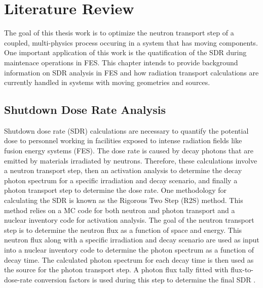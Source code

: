 \chapter{Literature Review} \label{ch:litrev}
The goal of this thesis work is to optimize the neutron transport step of a
coupled, multi-physics process occuring in a system that has moving components.  One
important application of this work is the quatification of the SDR during
maintenace operations in FES.
This chapter intends to provide background information on SDR analysis
in FES and how radiation transport calculations are currently handled in systems with
moving geometries and sources.

\section{Shutdown Dose Rate Analysis}\label{sec:sdr_calcs}
Shutdown dose rate (SDR) calculations are necessary to quantify the potential
dose to personnel working in facilities exposed to intense radiation fields
like fusion energy systems (FES).  The dose rate is caused by decay photons
that are emitted by materials irradiated by neutrons.  Therefore, these calculations involve a neutron
transport step, then an activation analysis to determine the decay photon
spectrum for a specific irradiation and decay scenario,
and finally a photon transport step to determine the dose rate.
One methodology for calculating the SDR is known as the Rigorous Two Step (R2S)
method.  This method relies on a MC code for both neutron and photon transport
and a nuclear inventory code for activation analysis.
The goal of the neutron transport step is to determine the neutron flux
as a function of space and energy.  This neutron flux along with a specific irradiation
and decay scenario are used as input into a nuclear inventory
code to determine the photon spectrum as a function of decay time.
The calculated photon spectrum for each decay time
is then used as the source for the photon transport step.  A photon flux tally
fitted with flux-to-dose-rate conversion factors is used during this step to
determine the final SDR \cite{Chen_2002}.




